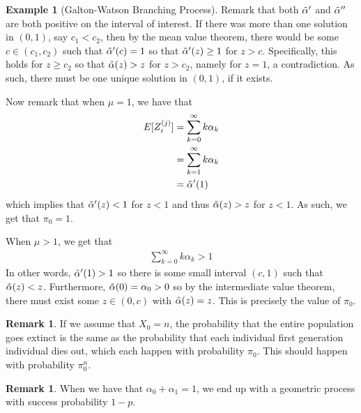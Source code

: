 \documentclass[11pt]{amsart}
\theoremstyle{definition}
\newtheorem{remark}[theorem]{Remark}
\newtheorem{example}[theorem]{Example}
\numberwithin{equation}{section}
\begin{document}
\begin{example}[Galton-Watson Branching Process]
 Remark that both $\Tilde{\alpha}'$ and $\Tilde{\alpha}''$ are both positive on the interval of interest. If there was more than one solution in $(0,1)$, say $c_1<c_2$, then by the mean value theorem, there would be some $c\in(c_1,c_2)$ such that $\Tilde{\alpha}'(c)=1$ so that $\Tilde{\alpha}'(z)\ge1$ for $z>c$. Specifically, this holds for $z\ge c_2$ so that $\Tilde{\alpha}(z)>z$ for $z>c_2$, namely for $z=1$, a contradiction. As such, there must be one unique solution in $(0,1)$, if it exists.

 Now remark that when $\mu=1$, we have that 
 \begin{align*}
     E[Z_i^{(j)}]&=\sum_{k=0}^\infty k\alpha_k\\
     &=\sum_{k=1}^\infty k\alpha_k\\
     &=\Tilde{\alpha}'(1)
 \end{align*}
 which implies that $\Tilde{\alpha}'(z)<1$ for $z<1$ and thus $\Tilde{\alpha}(z)>z$ for $z<1$. As such, we get that $\pi_0=1$. 

 When $\mu>1$, we get that
 \begin{align*}
     \sum_{k=0}^\infty k\alpha_k>1
 \end{align*}
 In other words, $\Tilde{\alpha}'(1)>1$ so there is some small interval $(c,1)$ such that $\Tilde{\alpha}(z)<z$. Furthermore, $\Tilde{\alpha}(0)=\alpha_0>0$ so by the intermediate value theorem, there must exist some $z\in(0,c)$ with $\Tilde{\alpha}(z)=z$. This is precisely the value of $\pi_0$.
 \end{example}
 \begin{remark}
     If we assume that $X_0=n$, the probability that the entire population goes extinct is the same as the probability that each individual first generation individual dies out, which each happen with probability $\pi_0$. This should happen with probability $\pi_0^n$.
 \end{remark}
 \begin{remark}
     When we have that $\alpha_0+\alpha_1=1$, we end up with a geometric process with success probability $1-p$.
 \end{remark}
\end{document}
